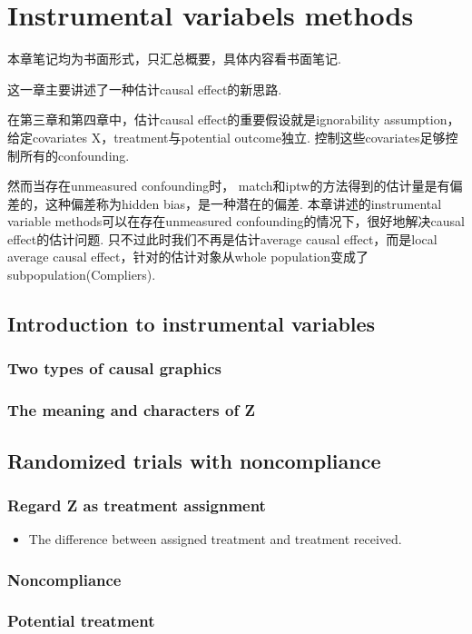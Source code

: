 \chapter{Instrumental variabels methods}
本章笔记均为书面形式，只汇总概要，具体内容看书面笔记.

这一章主要讲述了一种估计causal effect的新思路. 

在第三章和第四章中，估计causal effect的重要假设就是ignorability assumption，给定covariates X，treatment与potential outcome独立. 控制这些covariates足够控制所有的confounding.

然而当存在unmeasured confounding时， match和iptw的方法得到的估计量是有偏差的，这种偏差称为hidden bias，是一种潜在的偏差. 本章讲述的instrumental variable methods可以在存在unmeasured confounding的情况下，很好地解决causal effect的估计问题. 只不过此时我们不再是估计average causal effect，而是local average causal effect，针对的估计对象从whole population变成了subpopulation(Compliers).

\section{Introduction to instrumental variables}
\subsection{Two types of causal graphics}
\subsection{The meaning and characters of Z}


\section{Randomized trials with noncompliance}
\subsection{Regard Z as treatment assignment}
\begin{itemize}
	\item The difference between assigned treatment and treatment received.
\end{itemize}
\subsection{Noncompliance}
\subsection{Potential treatment}
